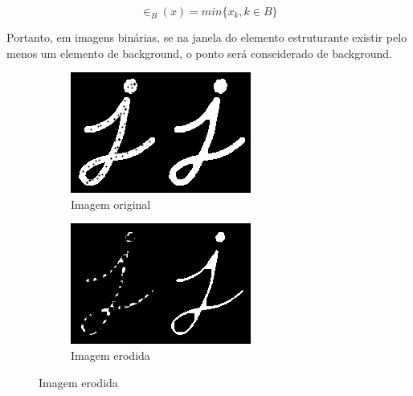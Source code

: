 \documentclass[10pt,a4paper]{article}
\begin{document}
\begin{equation}
    \in_B(x) = min\{x_k, k \in B\}
\end{equation}

Portanto, em imagens binárias, se na janela do elemento estruturante existir pelo menos um elemento de background, o ponto será conseiderado de background.

\begin{figure}[!ht]
    \centering
    \begin{subfigure}[ht]{0.45\textwidth}
        \includegraphics[width=\textwidth]{src.jpg}
        \caption{Imagem original}
    \end{subfigure}
    \qquad
    \begin{subfigure}[ht]{0.45\textwidth}
        \includegraphics[width=\textwidth]{erosion.jpg}
        \caption{Imagem erodida}
    \end{subfigure}
    \label{fig:erosion}
\end{figure}
\end{document}

